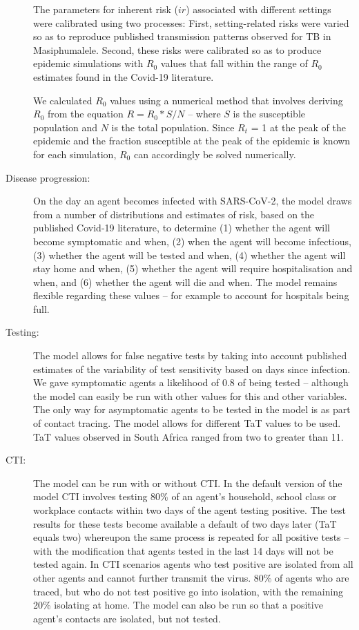 \documentclass{article}
\begin{document}
\begin{description}
  The parameters for inherent risk ($ir$) associated with different settings
  were calibrated using two processes: First, setting-related risks were varied
  so as to reproduce published transmission patterns observed for TB in
  Masiphumalele.\cite{Andrews2014} Second, these risks were calibrated so as to
  produce epidemic simulations with $R_0$ values that fall within the range of
  $R_0$ estimates found in the Covid-19 literature.\cite{Hellewell2020}

  We calculated $R_0$ values using a numerical method that involves deriving
  $R_0$ from the equation $R = R_0 * S/N$ – where $S$ is the susceptible
  population and $N$ is the total population.\cite{Vynnycky2010} Since
  $R_t$ = 1 at the peak of the epidemic and the fraction susceptible at the peak
  of the epidemic is known for each simulation, $R_0$ can accordingly be solved
  numerically.

\item[Disease progression:] On the day an agent becomes infected with
  SARS-CoV-2, the model draws from a number of distributions and estimates of
  risk, based on the published Covid-19 literature,\cite{Verity2020, SACMC2020}
  to determine (1) whether the agent will become symptomatic and when, (2) when
  the agent will become infectious, (3) whether the agent will be tested and
  when, (4) whether the agent will stay home and when, (5) whether the agent
  will require hospitalisation and when, and (6) whether the agent will die and
  when. The model remains flexible regarding these values – for example to
  account for hospitals being full.

\item[Testing:] The model allows for false negative tests by taking into account
  published estimates of the variability of test sensitivity based on days since
  infection. \cite{Kucirka2020} We gave symptomatic agents a likelihood of 0.8
  of being tested – although the model can easily be run with other values for
  this and other variables. The only way for asymptomatic agents to be tested in
  the model is as part of contact tracing. The model allows for different TaT
  values to be used. TaT values observed in South Africa ranged from two to
  greater than 11. \cite{NICD2020}

\item[CTI:] The model can be run with or without CTI. In the default version of
  the model CTI involves testing 80\% of an agent’s household, school class or
  workplace contacts within two days of the agent testing positive. The test
  results for these tests become available a default of two days later (TaT
  equals two) whereupon the same process is repeated for all positive tests –
  with the modification that agents tested in the last 14 days will not be
  tested again. In CTI scenarios agents who test positive are isolated from all
  other agents and cannot further transmit the virus. 80\% of agents who are
  traced, but who do not test positive go into isolation, with the remaining
  20\% isolating at home. The model can also be run so that a positive agent’s
  contacts are isolated, but not tested.


\end{description}
\end{document}
